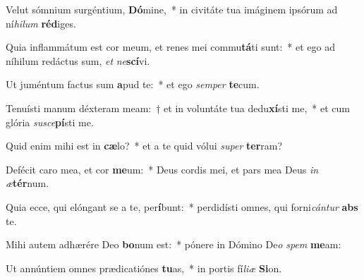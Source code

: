 \item Velut sómnium surgéntium, \textbf{Dó}mine,~* in civitáte tua imáginem ipsórum ad ní\textit{hilum} \textbf{réd}iges.
\item Quia inflammátum est cor meum, et renes mei commu\textbf{tá}ti sunt:~* et ego ad níhilum redáctus sum, \textit{et} \textit{ne}\textbf{scí}vi.
\item Ut juméntum factus sum \textbf{a}pud te:~* et ego \textit{semper} \textbf{te}cum.
\item Tenuísti manum déxteram meam:~† et in voluntáte tua dedu\textbf{xí}sti me,~* et cum glória \textit{susce}\textbf{pí}sti me.
\item Quid enim mihi est in \textbf{cæ}lo?~* et a te quid vólui \textit{super} \textbf{ter}ram?
\item Defécit caro mea, et cor \textbf{me}um:~* Deus cordis mei, et pars mea Deus \textit{in} \textit{æ}\textbf{tér}num.
\item Quia ecce, qui elóngant se a te, per\textbf{í}bunt:~* perdidísti omnes, qui forni\textit{cántur} \textbf{abs} te.
\item Mihi autem adhærére Deo \textbf{bo}num est:~* pónere in Dómino De\textit{o} \textit{spem} \textbf{me}am:
\item Ut annúntiem omnes prædicatiónes \textbf{tu}as,~* in portis fí\textit{liæ} \textbf{Si}on.
